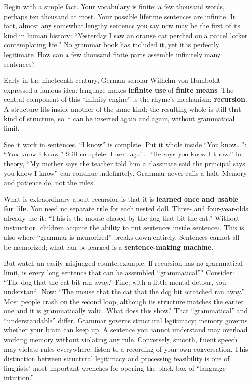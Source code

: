 Begin with a simple fact. Your vocabulary is finite: a few thousand words, perhaps ten thousand at most. Your possible lifetime sentences are infinite. In fact, almost any somewhat lengthy sentence you say now may be the first of its kind in human history: ``Yesterday I saw an orange cat perched on a parcel locker contemplating life.'' No grammar book has included it, yet it is perfectly legitimate. How can a few thousand finite parts assemble infinitely many sentences?

Early in the nineteenth century, German scholar Wilhelm von Humboldt expressed a famous idea: language makes \textbf{infinite use} of \textbf{finite means}. The central component of this ``infinity engine'' is the rhyme's mechanism: \textbf{recursion}. A structure fits inside another of the same kind; the resulting whole is still that kind of structure, so it can be inserted again and again, without grammatical limit.

See it work in sentences. ``I know'' is complete. Put it whole inside ``You know\ldots{}'': ``You know I know.'' Still complete. Insert again: ``He says you know I know.'' In theory, ``My mother says the teacher told him a classmate said the principal says you know I know'' can continue indefinitely. Grammar never calls a halt. Memory and patience do, not the rules.

What is extraordinary about recursion is that it is \textbf{learned once and usable for life}. You need no separate rule for each nested doll. Three- and four-year-olds already use it: ``This is the mouse chased by the dog that bit the cat.'' Without instruction, children acquire the ability to put sentences inside sentences. This is also where ``grammar is memorized'' breaks down entirely. Sentences cannot all be memorized; what can be learned is a \textbf{sentence-making machine}.

But watch an easily misjudged counterexample. If recursion has no grammatical limit, is every long sentence that can be assembled ``grammatical''? Consider: ``The dog that the cat bit ran away.'' Fine; with a little mental detour, you understand. Now: ``The mouse that the cat that the dog bit scratched ran away.'' Most people crash on the second loop, although its structure matches the earlier one and it is grammatically valid. What does this show? That ``grammatical'' and ``understandable'' differ. Grammar governs structural legitimacy; memory governs whether your brain can keep up. A sentence you cannot understand may overload working memory without violating any rule. Conversely, smooth, fluent speech may violate rules everywhere: listen to a recording of your own conversation. This distinction between structural legitimacy and processing feasibility is one of linguists' most important wrenches for opening the black box of ``language intuition.''

